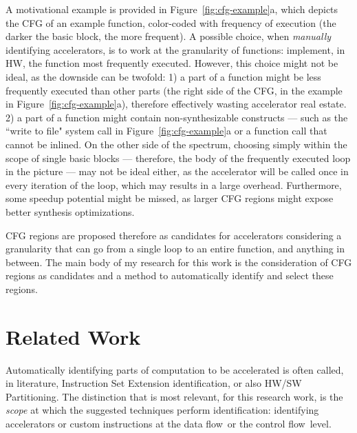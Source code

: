 \documentclass[]{usiinfthesis}
\newcommand{\dataflow}{data flow}
\newcommand{\controlflow}{control flow}
\begin{document}
A motivational example is provided in Figure~\ref{fig:cfg-example}a,
which depicts the CFG of an example function, color-coded with
frequency of execution (the darker the basic block, the more
frequent). A possible choice, when \emph{manually} identifying
accelerators, is to work at the granularity of functions: implement,
in HW, the function most frequently executed. However, this choice
might not be ideal, as the downside can be twofold: 1) a part of a
function might be less frequently executed than other parts (the right
side of the CFG, in the example in Figure~\ref{fig:cfg-example}a),
therefore effectively wasting accelerator real estate. 2) a part of a
function might contain non-synthesizable constructs --- such as the
``write to file" system call in Figure~\ref{fig:cfg-example}a or a function 
call that cannot be inlined.  On the
other side of the spectrum, choosing simply within the scope of single
basic blocks --- therefore, the body of the frequently executed loop
in the picture --- may not be ideal either, as the accelerator will be
called once in every iteration of the loop, which may results in a
large overhead. Furthermore, some speedup potential might be missed,
as larger CFG regions might expose better synthesis optimizations.\par

CFG regions are proposed therefore as candidates for
accelerators considering a granularity that can go from a
single loop to an entire function, and anything in between. 
The main body of my research for this work is the consideration 
of CFG regions as candidates and a method to 
automatically identify and select these regions.

\section{Related Work}
\label{sec:rw}

Automatically identifying parts of computation to be
accelerated is often called, in literature, Instruction Set Extension
identification, or also HW/SW Partitioning. The distinction that is most 
relevant, for this research work, is the
\emph{scope} at which the suggested techniques perform identification: 
identifying accelerators or custom instructions at the \dataflow\ or
the \controlflow\ level.\par
\end{document}
